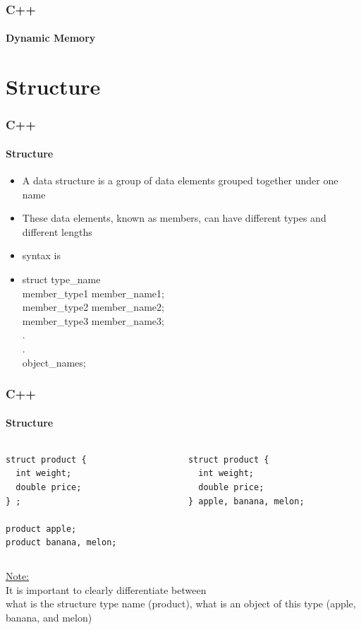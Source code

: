 \documentclass[hyperref={pdfpagelabels=true}]{beamer}
\begin{document}
\begin{frame}[shrink]
\frametitle{C++}
\framesubtitle{Dynamic Memory}


\end{frame}

\section{Structure}

\begin{frame}
\frametitle{C++}
\framesubtitle{Structure}
\begin{itemize}[<+->]
\item A data structure is a group of data elements grouped together under one name
\item These data elements, known as members, can have different types and different lengths
\item syntax is
\item[]  struct type\_name { \\
member\_type1 member\_name1;\\
member\_type2 member\_name2;\\
member\_type3 member\_name3;\\
.\\
.\\
} object\_names;
\end{itemize}
\end{frame}

\begin{frame}[fragile]
\frametitle{C++}
\framesubtitle{Structure}
{{
	\begin{columns}[t]
  		\begin{column}{5cm}
    			\begin{verbatim}
struct product {
  int weight;
  double price;
} ;

product apple;
product banana, melon;
	\end{verbatim}
  		\end{column}
  		\begin{column}{5cm}
\begin{verbatim}
struct product {
  int weight;
  double price;
} apple, banana, melon;
\end{verbatim}
  		\end{column}
	\end{columns}}}
\vfil
\bigskip
\underline{Note: } \\
It is important to clearly differentiate between \\
 {what is the \alert{structure type} name (product),}
 {what is an object of this \alert{type (apple, banana, and melon)}}
\end{frame}
\end{document}
